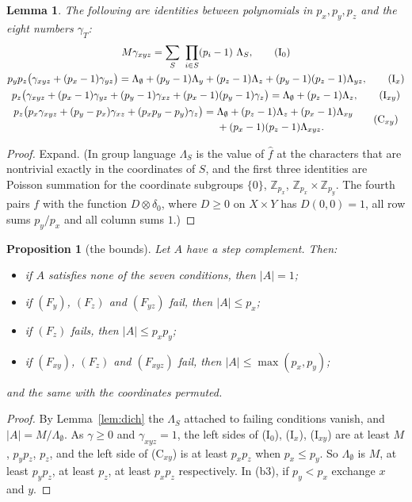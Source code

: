 \documentclass[11pt,a4paper]{amsart}
\newtheorem{proposition}[theorem]{Proposition}
\newtheorem{lemma}[theorem]{Lemma}
\theoremstyle{definition}
\theoremstyle{remark}
\newcommand{\Z}{\mathbb{Z}}
\begin{document}
\begin{lemma}\label{lem:ident}
The following are identities between polynomials in $p_x,p_y,p_z$ and the eight numbers $\gamma_T$:
\begin{gather*}
 M\gamma_{xyz}=\sum_{S}\ \prod_{i\in S}(p_i-1)\ \Lambda_S, \tag{I$_0$}\\
 p_yp_z\bigl(\gamma_{xyz}+(p_x-1)\gamma_{yz}\bigr)=\Lambda_\emptyset+(p_y-1)\Lambda_y+(p_z-1)\Lambda_z
   +(p_y-1)(p_z-1)\Lambda_{yz}, \tag{I$_x$}\\
 p_z\bigl(\gamma_{xyz}+(p_x-1)\gamma_{yz}+(p_y-1)\gamma_{xz}+(p_x-1)(p_y-1)\gamma_{z}\bigr)
   =\Lambda_\emptyset+(p_z-1)\Lambda_z, \tag{I$_{xy}$}\\
 \begin{aligned}
 p_z\bigl(p_x\gamma_{xyz}+(p_y-p_x)\gamma_{xz}+(p_xp_y-p_y)\gamma_{z}\bigr)
   ={}&\Lambda_\emptyset+(p_z-1)\Lambda_z+(p_x-1)\Lambda_{xy}\\
   &{}+(p_x-1)(p_z-1)\Lambda_{xyz}.
 \end{aligned} \tag{C$_{xy}$}
\end{gather*}
\end{lemma}
\begin{proof}
Expand. (In group language $\Lambda_S$ is the value of $\hat f$ at the characters that are nontrivial exactly in
the coordinates of $S$, and the first three identities are Poisson summation for the coordinate subgroups
$\{0\}$, $\Z_{p_x}$, $\Z_{p_x}\times\Z_{p_y}$. The fourth pairs $f$ with the function $D\otimes\delta_0$, where
$D\ge 0$ on $X\times Y$ has $D(0,0)=1$, all row sums $p_y/p_x$ and all column sums $1$.)
\end{proof}

\begin{proposition}[the bounds]\label{prop:bounds}
Let $A$ have a step complement. Then:
\begin{itemize}
\item[\textup{(b0)}] if $A$ satisfies none of the seven conditions, then $|A|=1$;
\item[\textup{(b1)}] if $(F_y)$, $(F_z)$ and $(F_{yz})$ fail, then $|A|\le p_x$;
\item[\textup{(b2)}] if $(F_z)$ fails, then $|A|\le p_xp_y$;
\item[\textup{(b3)}] if $(F_{xy})$, $(F_z)$ and $(F_{xyz})$ fail, then $|A|\le\max(p_x,p_y)$;
\end{itemize}
and the same with the coordinates permuted.
\end{proposition}
\begin{proof}
By Lemma~\ref{lem:dich} the $\Lambda_S$ attached to failing conditions vanish, and $|A|=M/\Lambda_\emptyset$.
As $\gamma\ge0$ and $\gamma_{xyz}=1$, the left sides of (I$_0$), (I$_x$), (I$_{xy}$) are at least $M$, $p_yp_z$,
$p_z$, and the left side of (C$_{xy}$) is at least $p_xp_z$ when $p_x\le p_y$. So $\Lambda_\emptyset$ is
$M$, at least $p_yp_z$, at least $p_z$, at least $p_xp_z$ respectively. In (b3), if $p_y<p_x$ exchange $x$ and $y$.
\end{proof}
\end{document}
